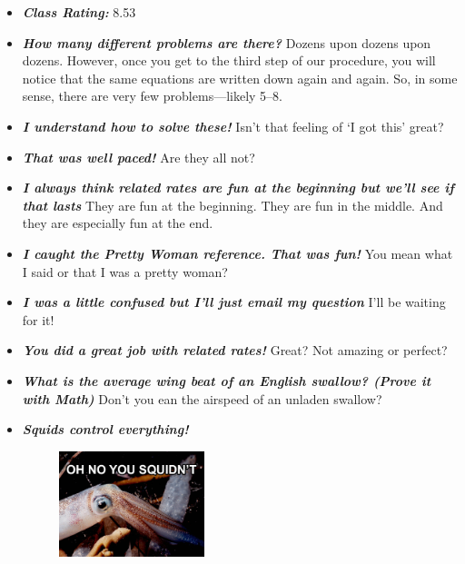 \documentclass[11pt,letterpaper]{article}
\begin{document}
\begin{itemize}
\item {\bfseries\itshape Class Rating:} 8.53

\item {\bfseries\itshape How many different problems are there?} Dozens upon dozens upon dozens. However, once you get to the third step of our procedure, you will notice that the same equations are written down again and again. So, in some sense, there are very few problems---likely 5--8. 

\item {\bfseries\itshape I understand how to solve these!} Isn't that feeling of `I got this' great?

\item {\bfseries\itshape That was well paced!} Are they all not?

\item {\bfseries\itshape I always think related rates are fun at the beginning but we'll see if that lasts} They are fun at the beginning. They are fun in the middle. And they are especially fun at the end. 

\item {\bfseries\itshape I caught the Pretty Woman reference. That was fun!} You mean what I said or that I was a pretty woman?

\item {\bfseries\itshape I was a little confused but I'll just email my question} I'll be waiting for it!

\item {\bfseries\itshape You did a great job with related rates!} Great? Not amazing or perfect?

\item {\bfseries\itshape What is the average wing beat of an English swallow? (Prove it with Math)} Don't you ean the airspeed of an unladen swallow? 

\item {\bfseries\itshape Squids control everything!} 
	\begin{figure}[H]
	\centering
	\includegraphics[width=0.40\textwidth]{images/squid.jpg}
	\end{figure}


\end{itemize}
\end{document}
